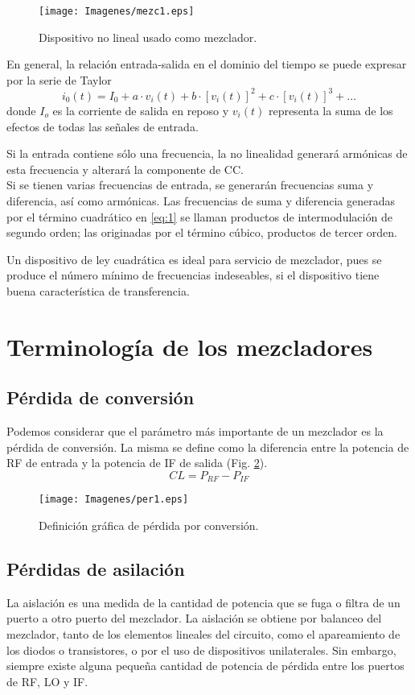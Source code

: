 \documentclass[conference]{IEEEtran}
\begin{document}
\begin{figure}[h!]
\centering
\texttt{[image: Imagenes/mezc1.eps]}
\caption{Dispositivo no lineal usado como mezclador.}
\label{mezc1}
\end{figure}
En general, la relación entrada-salida en el dominio del tiempo se puede expresar por la serie de Taylor
\begin{equation}
i_{0}(t) = I_{0}+ a\cdot v_{i}(t) + b\cdot [v_{i}(t)]^2 + c\cdot [v_{i}(t)]^3 + \ldots
\label{eq:1}
\end{equation}
donde $I_o$ es la corriente de salida en reposo y $v_{i}(t)$ representa la suma de los efectos de todas las señales de entrada.

Si la entrada contiene sólo una frecuencia, la no linealidad generará armónicas de esta frecuencia y alterará la componente de CC.\\
Si se tienen varias frecuencias de entrada, se generarán frecuencias suma y diferencia, así como armónicas. Las frecuencias de suma y diferencia generadas por el término cuadrático en \eqref{eq:1} se llaman productos de intermodulación de segundo orden; las originadas por el término cúbico, productos de tercer orden.

Un dispositivo de ley cuadrática es ideal para servicio de mezclador, pues se produce el número mínimo de frecuencias indeseables, si el dispositivo tiene buena característica de transferencia.
			
\section{Terminología de los mezcladores}
\subsection{Pérdida de conversión}
Podemos considerar que el parámetro  más importante de un mezclador es la pérdida de conversión. La misma se define como la diferencia entre la potencia de RF de entrada y la potencia de IF de salida (Fig. \ref{per1}).\\
$$CL = P_{RF} - P_{IF} $$

			\begin{figure}[h!]
			\centering
			\texttt{[image: Imagenes/per1.eps]}
			\caption{Definición gráfica de pérdida por conversión.}
			\label{per1}
			\end{figure}

\subsection{Pérdidas de asilación}
La  aislación  es  una  medida  de  la  cantidad  de  potencia  que  se  fuga   o  filtra  de  un  puerto  a  otro  puerto  del mezclador. La aislación se obtiene por balanceo del mezclador, tanto de los elementos lineales del circuito, como el  apareamiento  de  los  diodos o transistores, o por el uso de dispositivos unilaterales. Sin embargo, siempre existe alguna pequeña cantidad de potencia de pérdida entre los puertos de RF, LO y IF. 
\end{document}
